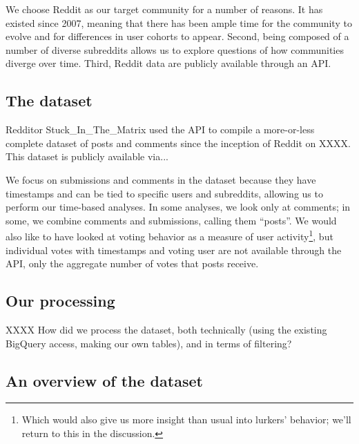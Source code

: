 {We choose Reddit as our target community for a number of reasons.  It has existed since 2007, meaning that there has been ample time for the community to evolve and for differences in user cohorts to appear.  Second, being composed of a number of diverse subreddits allows us to explore questions of how communities diverge over time.  Third, Reddit data are publicly available through an API.

\subsection{The dataset}

Redditor Stuck_In_The_Matrix used the API to compile a more-or-less complete dataset of posts and comments since the inception of Reddit on XXXX.  This dataset is publicly available via...



We focus on submissions and comments in the dataset because they have timestamps and can be tied to specific users and subreddits, allowing us to perform our time-based analyses.   In some analyses, we look only at comments; in some, we combine comments and submissions, calling them ``posts''.  We would also like to have looked at voting behavior as a measure of user activity\footnote{Which would also give us more insight than usual into lurkers' behavior; we'll return to this in the discussion.}, but individual votes with timestamps and voting user are not available through the API, only the aggregate number of votes that posts receive.


\subsection{Our processing}

XXXX How did we process the dataset, both technically (using the existing BigQuery access, making our own tables), and in terms of filtering?

\subsection{An overview of the dataset}

}
